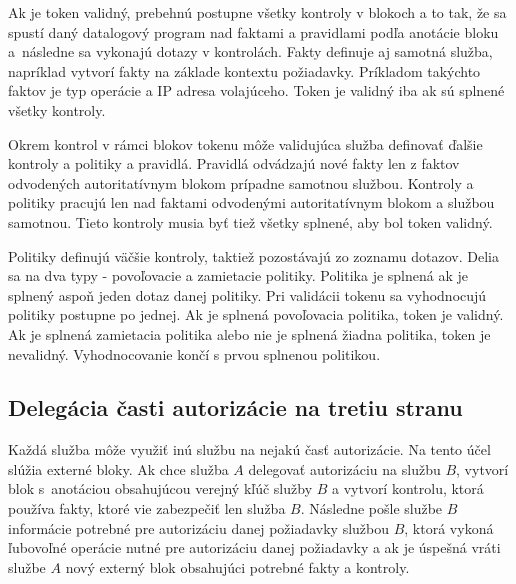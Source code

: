 Ak je token validný, prebehnú postupne všetky kontroly v blokoch a to tak, že sa spustí daný datalogový program nad faktami a pravidlami podľa anotácie bloku a~následne sa vykonajú dotazy v kontrolách. Fakty definuje aj samotná služba, napríklad vytvorí fakty na základe kontextu požiadavky. Príkladom takýchto faktov je typ operácie a IP adresa volajúceho. Token je validný iba ak sú splnené všetky kontroly. 

Okrem kontrol v rámci blokov tokenu môže validujúca služba definovať ďalšie kontroly a politiky a pravidlá. Pravidlá odvádzajú nové fakty len z faktov odvodených autoritatívnym blokom prípadne samotnou službou. Kontroly a politiky pracujú len nad faktami odvodenými autoritatívnym blokom a službou samotnou. Tieto kontroly musia byť tiež všetky splnené, aby bol token validný.

Politiky definujú väčšie kontroly, taktiež pozostávajú zo zoznamu dotazov. Delia sa na dva typy - povoľovacie a zamietacie politiky. Politika je splnená ak je splnený aspoň jeden dotaz danej politiky. Pri validácii tokenu sa vyhodnocujú politiky postupne po jednej. Ak je splnená povoľovacia politika, token je validný. Ak je splnená zamietacia politika alebo nie je splnená žiadna politika, token je nevalidný. Vyhodnocovanie končí s prvou splnenou politikou.

\subsection{Delegácia časti autorizácie na tretiu stranu}

Každá služba môže využiť inú službu na nejakú časť autorizácie. Na tento účel slúžia externé bloky. Ak chce služba $A$ delegovať autorizáciu na službu $B$, vytvorí blok s~anotáciou obsahujúcou verejný kľúč služby $B$ a vytvorí kontrolu, ktorá používa fakty, ktoré vie zabezpečiť len služba $B$. Následne pošle službe $B$ informácie potrebné pre autorizáciu danej požiadavky službou $B$, ktorá vykoná ľubovoľné operácie nutné pre autorizáciu danej požiadavky a ak je úspešná vráti službe $A$ nový externý blok obsahujúci potrebné fakty a kontroly. 
